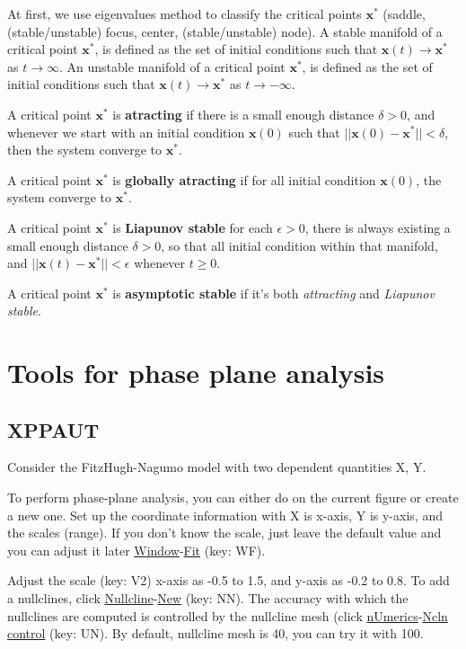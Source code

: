 At first, we use eigenvalues method to classify the critical points
$\mathbf{x}^*$ (saddle, (stable/unstable) focus, center, (stable/unstable)
node). A stable manifold of a critical point $\mathbf{x}^*$, is defined as the
set of initial conditions such that $\mathbf{x}(t)\rightarrow \mathbf{x}^*$ as
$t\rightarrow \infty$. An unstable manifold of a critical point $\mathbf{x}^*$,
is defined as the set of initial conditions such that $\mathbf{x}(t)\rightarrow
\mathbf{x}^*$ as $t\rightarrow -\infty$.


A critical point $\mathbf{x}^*$ is {\bf atracting} if there is a small enough
distance $\delta > 0$, and whenever we start with an initial condition $\mathbf{x}(0)$
such that $||\mathbf{x}(0)-\mathbf{x}^*|| < \delta$, then the system converge to
$\mathbf{x}^*$. 

A critical point $\mathbf{x}^*$ is {\bf globally atracting} if for all initial
condition $\mathbf{x}(0)$, the system converge to $\mathbf{x}^*$.

A critical point $\mathbf{x}^*$ is {\bf Liapunov stable} for each $\epsilon >0$,
there is always existing a small enough distance $\delta > 0$, so that all
initial condition within that manifold,  and $||\mathbf{x}(t)-\mathbf{x}^*|| <
\epsilon$ whenever $t\ge 0$.

A critical point $\mathbf{x}^*$ is {\bf asymptotic stable} if it's both {\it
attracting} and {\it Liapunov stable}. 

\section{Tools for phase plane analysis}
\label{sec:tools-phase-plane}


\subsection{XPPAUT}
\label{sec:case-study-10-1}

Consider the FitzHugh-Nagumo model with two dependent quantities X, Y.



To perform phase-plane analysis, you can either do on the current
figure or create a new one. Set up the coordinate information with X
is x-axis, Y is y-axis, and the scales (range). If you don't know the
scale, just leave the default value and you can adjust it later
\underline{Window}-\underline{Fit} (key: WF). 

Adjust the scale (key: V2) x-axis as -0.5 to 1.5, and y-axis as -0.2
to 0.8. To add a nullclines, click
\underline{Nullcline}-\underline{New} (key: NN). The accuracy with
which the nullclines are computed is controlled by the nullcline mesh
(click \underline{nUmerics}-\underline{Ncln control} (key: UN). By
default, nullcline mesh is 40, you can try it with 100.


